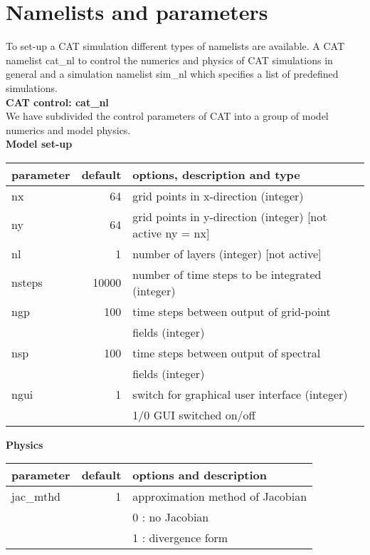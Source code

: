 \chapter{Namelists and parameters}
To set-up a CAT simulation different types of namelists are available. 
A CAT namelist cat{\_}nl to control the numerics and physics of CAT
simulations in general and a simulation namelist sim{\_}nl which specifies 
a list of predefined simulations.\\ 

\noindent
{\bf \Large CAT control: cat{\_}nl} \\
\noindent
We have subdivided the control parameters of CAT into a group of model
numerics and model physics. \\

\noindent
{\bf Model set-up} \\ 
\noindent
\begin{tabular}{|l|r|l|}
 \hline
 parameter & default & options, description and type \\
 \hline
 nx      &   64       & grid points in x-direction (integer) \\
 ny      &   64       & grid points in y-direction (integer) [not active ny = nx] \\
 nl      &   1        & number of layers (integer) [not active]  \\
 nsteps  &   10000    & number of time steps to be integrated (integer) \\
 ngp     &   100      & time steps between output of grid-point  \\
         &            & fields (integer) \\
 nsp     &   100      & time steps between output of spectral  \\
         &            & fields (integer) \\
 ngui    &   1        & switch for graphical user interface (integer) \\
         &            & 1/0 GUI switched on/off                        \\
 \hline
\end{tabular} 

\vspace{0.5cm}

\noindent
{\bf Physics} \\ 
\noindent
\begin{tabular}{|l|r|l|}
 \hline
 parameter & default & options and description \\
 \hline
 jac{\_}mthd  &  1       & approximation method of Jacobian  \\
              &          & 0 : no Jacobian  \\
              &          & 1 : divergence form \\
 \hline
\end{tabular}

